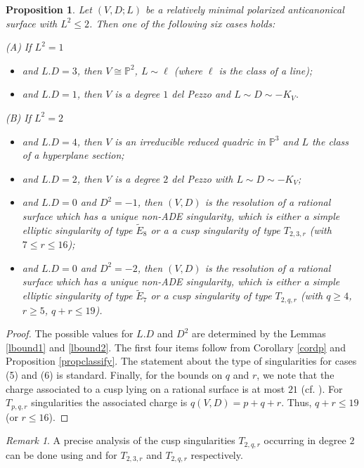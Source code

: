 \documentclass{amsart}
\numberwithin{equation}{section}
\theoremstyle{plain}
\newtheorem{proposition}[equation]{Proposition}
\theoremstyle{remark}
\newtheorem{remark}[equation]{Remark}
\theoremstyle{definition}
\newcommand{\bP}{\mathbb{P}}
\newcommand{\Es}{\widetilde{E}_7}
\newcommand{\Ee}{\widetilde{E}_8}
\begin{document}
\begin{proposition}\label{classifydeg2}
Let $(V,D;L)$ be a relatively minimal polarized anticanonical surface with $L^2\le 2$. Then one of the following six cases holds:

\noindent (A) If $L^2=1$
\begin{itemize}
\item[(1)]  and $L.D=3$, then $V\cong \bP^2$, $L\sim \ell$ (where $\ell$ is the class of a line);
\item[(2)] and $L.D=1$, then $V$ is a degree $1$ del Pezzo and $L\sim D\sim -K_V$. 
\end{itemize}
\noindent (B) If $L^2=2$
\begin{itemize}
\item[(3)] and $L.D=4$, then $V$ is an irreducible reduced quadric in $\bP^3$ and $L$ the class of a hyperplane section; 
\item[(4)] and $L.D=2$, then $V$ is a degree $2$ del Pezzo with $L\sim D\sim -K_V$; 
\item[(5)] and $L.D=0$ and $D^2=-1$, then $(V,D)$ is the resolution of a rational surface which has a unique non-ADE singularity, which is either a simple elliptic singularity of type $\Ee$ or a a cusp singularity of type $T_{2,3,r}$ (with $7\le r\le 16$);
\item[(6)] and $L.D=0$ and $D^2=-2$, then $(V,D)$ is the resolution of a rational surface which has a unique non-ADE singularity, which is either a simple elliptic singularity of type $\Es$ or a cusp singularity of type $T_{2,q,r}$ (with $q\ge 4$, $r\ge 5$, $q+r\le 19$).
\end{itemize}
\end{proposition}
\begin{proof}
The possible values for $L.D$ and $D^2$ are determined by the Lemmas \ref{lbound1} and \ref{lbound2}. The first four items follow from Corollary \ref{cordp} and Proposition \ref{propclassify}. The statement about the type of singularities for cases (5) and (6) is standard. Finally, for the bounds on $q$ and $r$, we note that  the charge associated to a cusp lying on a rational surface is at most $21$ (cf. \cite[Lem. 4.6]{fmiranda}). For $T_{p,q,r}$ singularities the associated charge is $q(V,D)=p+q+r$. Thus, $q+r\le 19$ (or $r\le 16$).\end{proof}

\begin{remark}
A precise analysis of the cusp singularities $T_{2,q,r}$ occurring in degree $2$ can be done using \cite[\S5]{wall} and \cite[\S6]{wall} for $T_{2,3,r}$ and $T_{2,q,r}$ respectively. 
\end{remark}
\end{document}
